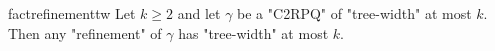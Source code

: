\begin{restatable}{fact}{refinementtw}
    \AP\label{fact:refinement-tw}
    Let $k \geq 2$ and let $\gamma$ be a "C2RPQ" of "tree-width" at most $k$.
    Then any "refinement" of $\gamma$ has "tree-width" at most $k$.
\end{restatable}


